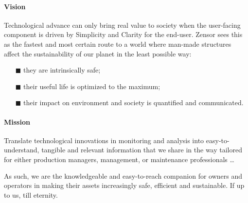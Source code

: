 \paragraph{Vision}
Technological advance can only bring real value to society when the user-facing component is driven by Simplicity and Clarity for the end-user.
Zensor sees this as the fastest and most certain route to a world where man-made structures affect the sustainability of our planet in the least possible way:
\begin{enumerate}
    \item[$\blacksquare$] they are intrinsically safe;
    \item[$\blacksquare$] their useful life is optimized to the maximum;
    \item[$\blacksquare$] their impact on environment and society is quantified and communicated.
\end{enumerate}

\paragraph{Mission}
Translate technological innovations in monitoring and analysis into easy-to-understand, tangible and relevant information that we share in the way tailored for either production managers,
management, or maintenance professionals \dots \par
As such, we are the knowledgeable and easy-to-reach companion for owners and operators in making their assets increasingly safe, efficient and sustainable. If up to us, till eternity.